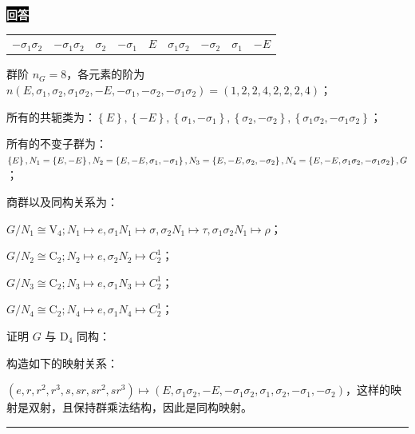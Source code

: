 \documentclass[11pt,a4paper]{ctexart}
\newenvironment{answer}
  {\par\smallskip\noindent
   \begingroup
   \setlength{\fboxsep}{4pt}%
   \colorbox{black}{\textcolor{white}{\bfseries 回答}}%
   \endgroup
   \quad\ignorespaces}
  {\par\smallskip\noindent\rule{\linewidth}{0.4pt}\medskip}
\begin{document}
\begin{answer}
\begin{center}
\begin{tabular}{c|*{8}{c}}
    $-\sigma_1\sigma_2$
    & $-\sigma_1\sigma_2$
    & $\sigma_2$
    & $-\sigma_1$
    & $E$
    & $\sigma_1\sigma_2$
    & $-\sigma_2$
    & $\sigma_1$
    & $-E$
  \end{tabular}
  \end{center}

  群阶 $n_G=8 $，各元素的阶为 $n\left(E,\sigma_1,\sigma_2,\sigma_1\sigma_2,-E,-\sigma_1,-\sigma_2,-\sigma_1\sigma_2 \right)=\left(1,2,2,4,2,2,2,4 \right) $；

  所有的共轭类为：$\left\{E \right\},\left\{-E \right\},\left\{\sigma_1,-\sigma_1 \right\},\left\{\sigma_2,-\sigma_2 \right\},\left\{\sigma_1\sigma_2,-\sigma_1\sigma_2 \right\} $；

  所有的不变子群为：$\left\{E \right\},N_1=\left\{E,-E \right\},N_2=\left\{E,-E,\sigma_1,-\sigma_1 \right\},N_3=\left\{E,-E,\sigma_2,-\sigma_2 \right\},\\ N_4=\left\{E,-E,\sigma_1\sigma_2,-\sigma_1\sigma_2 \right\},G $；

  商群以及同构关系为：
  
  $G/N_1 \cong \mathrm{V}_4;N_1 \mapsto e,\sigma_1 N_1 \mapsto \sigma,\sigma_2 N_1 \mapsto \tau,\sigma_1\sigma_2 N_1 \mapsto \rho $；

  $G/N_2 \cong \mathrm{C}_2;N_2 \mapsto e,\sigma_2 N_2 \mapsto C_2^1 $；

  $G/N_3 \cong \mathrm{C}_2;N_3 \mapsto e,\sigma_1 N_3 \mapsto C_2^1 $；
  
  $G/N_4 \cong \mathrm{C}_2;N_4 \mapsto e,\sigma_1 N_4 \mapsto C_2^1 $；

  证明 $G $ 与 $\mathrm{D}_4 $ 同构：
  
  构造如下的映射关系：

  $\left(e,r,r^2,r^3,s,sr,sr^2,sr^3 \right) \mapsto \left(E,\sigma_1\sigma_2,-E,-\sigma_1\sigma_2,\sigma_1,\sigma_2,-\sigma_1,-\sigma_2 \right) $，这样的映射是双射，且保持群乘法结构，因此是同构映射。

\end{answer}
\end{document}
